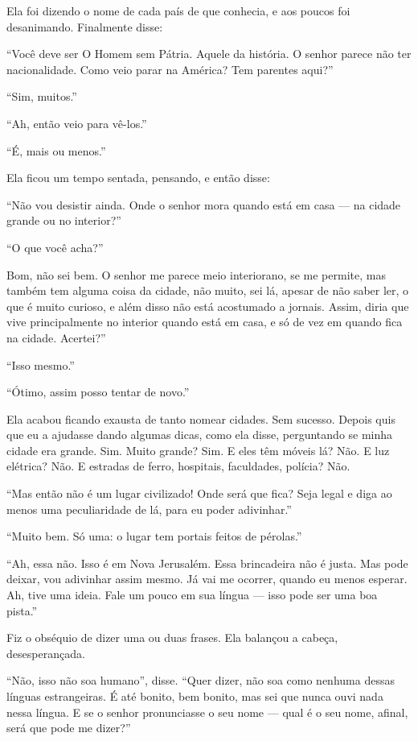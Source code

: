 Ela foi dizendo o nome de cada país de que conhecia, e aos poucos foi
desanimando. Finalmente disse:

“Você deve ser O Homem sem Pátria. Aquele da história. O senhor parece não ter
nacionalidade. Como veio parar na América? Tem parentes aqui?”

“Sim, muitos.”

“Ah, então veio para vê-los.”

“É, mais ou menos.”

Ela ficou um tempo sentada, pensando, e então disse:

“Não vou desistir ainda. Onde o senhor mora quando está em casa --- na cidade grande ou no
interior?”

“O que você acha?”

Bom, não sei bem. O senhor me parece meio interiorano, se me permite,
mas também tem alguma coisa da cidade, não muito, sei lá, apesar
de não saber ler, o que é muito curioso, e além disso não está acostumado a
jornais. Assim, diria que vive principalmente no interior quando está em casa, e
só de vez em quando fica na cidade. Acertei?”

“Isso mesmo.”

“Ótimo, assim posso tentar de novo.”

Ela acabou ficando exausta de tanto nomear cidades. Sem sucesso. Depois quis que eu a
ajudasse dando algumas dicas, como ela disse, perguntando se minha cidade era
grande. Sim. Muito grande? Sim. E eles têm móveis lá? Não. E luz elétrica? Não. E
estradas de ferro, hospitais, faculdades, polícia? Não.

“Mas então não é um lugar civilizado! Onde será que fica? Seja legal e
diga ao menos uma peculiaridade de lá, para eu poder adivinhar.”

“Muito bem. Só uma: o lugar tem portais feitos de pérolas.”

“Ah, essa não. Isso é em Nova Jerusalém. Essa brincadeira não é justa. Mas pode
deixar, vou adivinhar assim mesmo. Já vai me ocorrer, quando eu menos
esperar. Ah, tive uma ideia. Fale um pouco em sua língua --- isso pode ser uma boa
pista.”

Fiz o obséquio de dizer uma ou duas frases. Ela balançou a cabeça,
desesperançada.

“Não, isso não soa humano”, disse. “Quer dizer, não soa como nenhuma dessas
línguas estrangeiras. É até bonito, bem bonito, mas sei que nunca ouvi
nada nessa língua. E se o senhor pronunciasse o seu nome --- qual é o seu nome,
afinal, será que pode me dizer?”

